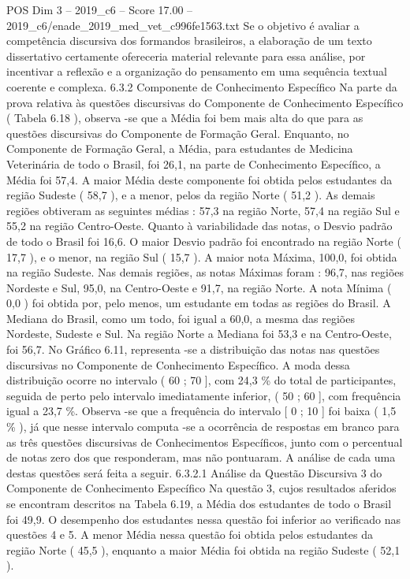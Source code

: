 \begin{textsample}{POS Dim 3 – 2019\_c6 – Score 17.00 – 2019\_c6/enade\_2019\_med\_vet\_c996fe1563.txt}
Se o objetivo é avaliar a competência discursiva dos formandos brasileiros, a elaboração de um texto dissertativo certamente ofereceria material relevante para essa análise, por incentivar a reflexão e a organização do pensamento em uma sequência textual coerente e complexa. 6.3.2 Componente de Conhecimento Específico Na parte da prova relativa às questões discursivas do Componente de Conhecimento Específico ( Tabela 6.18 ), observa -se que a Média foi bem mais alta do que para as questões discursivas do Componente de Formação Geral.
Enquanto, no Componente de Formação Geral, a Média, para estudantes de Medicina Veterinária de todo o Brasil, foi 26,1, na parte de Conhecimento Específico, a Média foi 57,4.
A maior Média deste componente foi obtida pelos estudantes da região Sudeste ( 58,7 ), e a menor, pelos da região Norte ( 51,2 ).
As demais regiões obtiveram as seguintes médias : 57,3 na região Norte, 57,4 na região Sul e 55,2 na região Centro-Oeste.
Quanto à variabilidade das notas, o Desvio padrão de todo o Brasil foi 16,6.
O maior Desvio padrão foi encontrado na região Norte ( 17,7 ), e o menor, na região Sul ( 15,7 ).
A maior nota Máxima, 100,0, foi obtida na região Sudeste.
Nas demais regiões, as notas Máximas foram : 96,7, nas regiões Nordeste e Sul, 95,0, na Centro-Oeste e 91,7, na região Norte.
A nota Mínima ( 0,0 ) foi obtida por, pelo menos, um estudante em todas as regiões do Brasil.
A Mediana do Brasil, como um todo, foi igual a 60,0, a mesma das regiões Nordeste, Sudeste e Sul.
Na região Norte a Mediana foi 53,3 e na Centro-Oeste, foi 56,7.
No Gráfico 6.11, representa -se a distribuição das notas nas questões discursivas no Componente de Conhecimento Específico.
A moda dessa distribuição ocorre no intervalo ( 60 ; 70 ], com 24,3 \% do total de participantes, seguida de perto pelo intervalo imediatamente inferior, ( 50 ; 60 ], com frequência igual a 23,7 \%.
Observa -se que a frequência do intervalo [ 0 ; 10 ] foi baixa ( 1,5 \% ), já que nesse intervalo computa -se a ocorrência de respostas em branco para as três questões discursivas de Conhecimentos Específicos, junto com o percentual de notas zero dos que responderam, mas não pontuaram.
A análise de cada uma destas questões será feita a seguir. 6.3.2.1 Análise da Questão Discursiva 3 do Componente de Conhecimento Específico Na questão 3, cujos resultados aferidos se encontram descritos na Tabela 6.19, a Média dos estudantes de todo o Brasil foi 49,9.
O desempenho dos estudantes nessa questão foi inferior ao verificado nas questões 4 e 5.
A menor Média nessa questão foi obtida pelos estudantes da região Norte ( 45,5 ), enquanto a maior Média foi obtida na região Sudeste ( 52,1 ).

\end{textsample}
